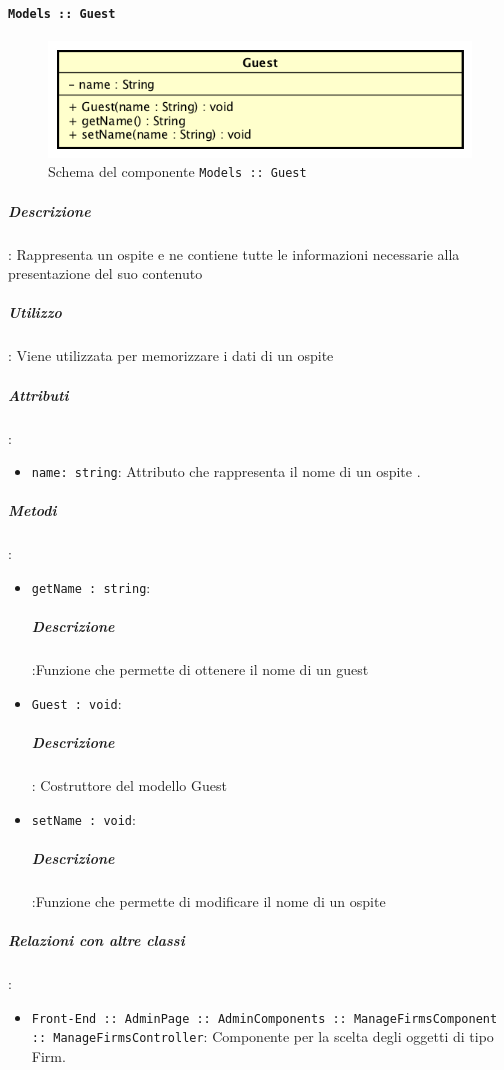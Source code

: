 \documentclass[../DefinizioneDiProdotto_v3.0.0.tex]{subfiles}
\begin{document}
	\paragraph{\texttt{Models :: Guest}}
	\acapo
	\begin{figure}[!h]
		\centering
		\includegraphics[scale=0.7]{Architettura/Front-End/Models/Guest.png}
		\caption{Schema del componente \texttt{Models :: Guest}}
	\end{figure}

		\subparagraph{Descrizione}: Rappresenta un ospite e ne contiene tutte le informazioni necessarie alla presentazione del suo contenuto
		\subparagraph{Utilizzo}: Viene utilizzata per memorizzare i dati di un ospite
		\subparagraph{Attributi}:
		      \begin{itemize}
		      	\item \texttt{name: string}:
		      	      Attributo che rappresenta il nome di un ospite
		      	      .
		      \end{itemize}
		\subparagraph{Metodi}:
		      \begin{itemize}
		      	\item \texttt{getName : string}:
		      	      \subparagraph{Descrizione}:Funzione che permette di ottenere il nome di un guest

		      	\item \texttt{Guest : void}:
		      	     \subparagraph{Descrizione}: Costruttore del modello Guest

		      	\item \texttt{setName : void}:
		      	      \subparagraph{Descrizione}:Funzione che permette di modificare il nome di un ospite
		      \end{itemize}

		\subparagraph{Relazioni con altre classi}:
		      \begin{itemize}
		      	\item \texttt{Front-End :: AdminPage :: AdminComponents :: ManageFirmsComponent :: ManageFirmsController}: Componente per la scelta degli oggetti di tipo Firm.
		      \end{itemize}
\end{document}
